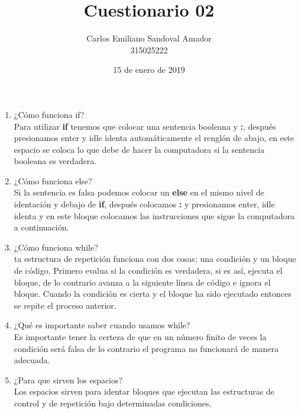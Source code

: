 \documentclass[letterpaper, 12pt, oneside]{article}%
\title{Cuestionario 02}
\author{Carlos Emiliano Sandoval Amador \\ 315025222}
\date{15 de enero de 2019}
\begin{document}
	\maketitle
	\begin{enumerate}
		\item ¿Cómo funciona if? \\ Para utilizar \textbf{if} tenemos que colocar una sentencia booleana y \textbf{:}, después presionamos enter y idle identa automáticamente el renglón de abajo, en este espacio se coloca lo que debe de hacer la computadora si la sentencia booleana es verdadera.
		\item ¿Cómo funciona else? \\ Si la sentencia es falsa podemos colocar un \textbf{else} en el mismo nivel de identación y debajo de \textbf{if}, después colocamos \textbf{:} y presionamos enter, idle identa y en este bloque colocamos las instrucciones que sigue la computadora a continuación.
		\item ¿Cómo funciona while? \\ ta estructura de repetición funciona con dos cosas; una condición y un bloque de código. Primero evalua si la condición es verdadera, si es así, ejecuta el bloque, de lo contrario avanza a la siguiente línea de código e ignora el bloque. Cuando la condición es cierta y el bloque ha sido ejecutado entonces se repite el proceso anterior.
		\item ¿Qué es importante saber cuando usamos while? \\ Es importante tener la certeza de que en un número finito de veces la condición será falsa de lo contrario el programa no funcionará de manera adecuada.
		\item ¿Para que sirven los espacios? \\ Los espacios sirven para identar bloques que ejecutan las estructuras de control y de repetición bajo determinadas condiciones.
		
	\end{enumerate}
\end{document}
